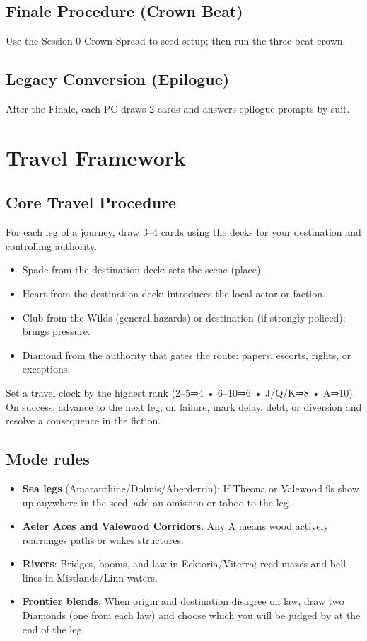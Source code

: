 \documentclass[11pt]{article}
\begin{document}
\subsection{Finale Procedure (Crown Beat)}
Use the Session 0 Crown Spread to seed setup; then run the three-beat crown.

\subsection{Legacy Conversion (Epilogue)}
After the Finale, each PC draws 2 cards and answers epilogue prompts by suit.

\section{Travel Framework}

\subsection{Core Travel Procedure}
For each leg of a journey, draw 3–4 cards using the decks for your destination and controlling authority.
\begin{itemize}
    \item Spade from the destination deck: sets the scene (place).
    \item Heart from the destination deck: introduces the local actor or faction.
    \item Club from the Wilds (general hazards) or destination (if strongly policed): brings pressure.
    \item Diamond from the authority that gates the route: papers, escorts, rights, or exceptions.
\end{itemize}

Set a travel clock by the highest rank (2–5⇒4 • 6–10⇒6 • J/Q/K⇒8 • A⇒10). On success, advance to the next leg; on failure, mark delay, debt, or diversion and resolve a consequence in the fiction.

\subsection{Mode rules}
\begin{itemize}
    \item \textbf{Sea legs} (Amaranthine/Dolmis/Aberderrin): If Theona or Valewood 9s show up anywhere in the seed, add an omission or taboo to the leg.
    \item \textbf{Aeler Aces and Valewood Corridors}: Any A means wood actively rearranges paths or wakes structures.
    \item \textbf{Rivers}: Bridges, booms, and law in Ecktoria/Viterra; reed-mazes and bell-lines in Mistlands/Linn waters.
    \item \textbf{Frontier blends}: When origin and destination disagree on law, draw two Diamonds (one from each law) and choose which you will be judged by at the end of the leg.
\end{itemize}
\end{document}
